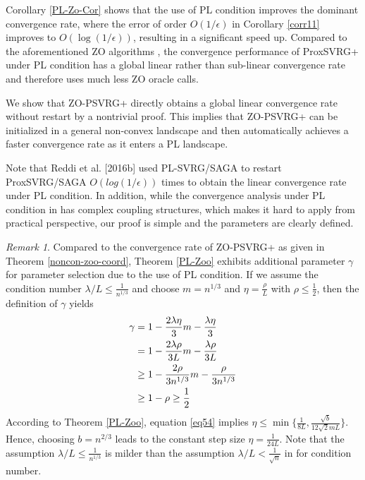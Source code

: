 \documentclass{article}
\theoremstyle{definition}
\theoremstyle{remark}
\newtheorem{remark}[theorem]{Remark}
\begin{document}
Corollary \ref{PL-Zo-Cor} shows that the use of PL condition improves the dominant convergence rate, where the error of
order $O(1/\epsilon)$ in Corollary \ref{corr11} improves to $O(\log(1/\epsilon))$, resulting in a significant speed up.
{\color{Brown}
 Compared to the aforementioned ZO algorithms \cite{duchi2015optimal,nesterov2017random,liu2018zeroth}, the convergence performance of ProxSVRG+ under PL condition has a global linear rather than sub-linear convergence rate and therefore  uses much less ZO oracle calls. 
}

{\color{Violet}
We show that ZO-PSVRG+ directly obtains a global linear convergence rate without restart by a nontrivial proof.
{\color{YellowOrange}
This implies that ZO-PSVRG+ can be initialized in a general non-convex landscape and then automatically achieves a faster convergence rate as it enters a PL landscape.
}

Note that Reddi et al. [2016b] used PL-SVRG/SAGA to restart ProxSVRG/SAGA $O(log(1/\epsilon))$ times to obtain
the linear convergence rate under PL condition.
{\color{YellowOrange}
 In addition, while the convergence analysis under PL condition in \cite{ji2019improved} has complex coupling structures, which makes it hard to apply from practical perspective, our proof is simple and the parameters are clearly defined.
}

}

\begin{remark}
Compared to the convergence rate of ZO-PSVRG+ as given in Theorem \ref{noncon-zoo-coord}, Theorem \ref{PL-Zoo} exhibits additional parameter $\gamma$ for parameter selection due to the use of PL condition. 
If we assume the condition number $\lambda/L\leq \frac{1}{n^{1/3}}$ and choose $m = n^{1/3}$ and $\eta = \frac{\rho}{L}$ with $\rho\leq \frac{1}{2}$, then the definition of $\gamma$ yields  
\begin{align}
\gamma &= 1-\frac{2\lambda\eta}{3} m-\frac{\lambda\eta}{3}\notag \\
& = 1 - \frac{2\lambda\rho}{3L}m - \frac{\lambda\rho}{3L}\notag\\
& \geq  1 - \frac{2\rho}{3n^{1/3}}m - \frac{\rho}{3n^{1/3}}\notag\\
& \geq  1 - \rho \geq \frac{1}{2}\label{eq54}
\end{align}
According to Theorem \ref{PL-Zoo}, equation \eqref{eq54} implies $\eta \leq \min\{\frac{1}{8L}, \frac{\sqrt{b}}{12\sqrt{2} m L }\}$. 
Hence, choosing $b = n^{2/3}$ leads to the constant step size  $\eta = \frac{1}{24 L}$.
Note that the assumption $\lambda/L \leq \frac{1}{{n}^{1/3}}$ is milder than the assumption $\lambda/L < \frac{1}{\sqrt{n}}$ in \cite{reddi2016proximal} for condition number.
\end{remark}
\end{document}
